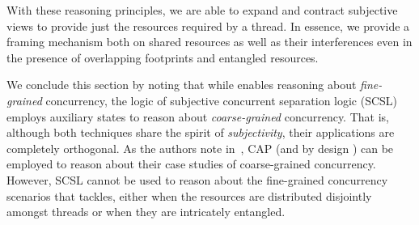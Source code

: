 With these reasoning principles, we are able to expand and contract subjective views to provide just the resources required by a thread. In essence, we provide a framing mechanism both on shared resources as well as their interferences even in the presence of overlapping footprints and entangled resources.

We conclude this section by noting that while \colosl enables reasoning about \emph{fine-grained} concurrency, the logic of subjective concurrent separation logic (SCSL)~\cite{SCSL} employs auxiliary states to reason about \emph{coarse-grained} concurrency. That is, although both techniques share the spirit of \emph{subjectivity}, their applications are completely orthogonal. As the authors note in~\cite{SCSL}, CAP (and by design \colosl) can be employed to reason about their case studies of coarse-grained concurrency. However, SCSL cannot be used to reason about the fine-grained concurrency scenarios that \colosl tackles, either when the resources are distributed disjointly amongst threads or when they are intricately entangled.
%